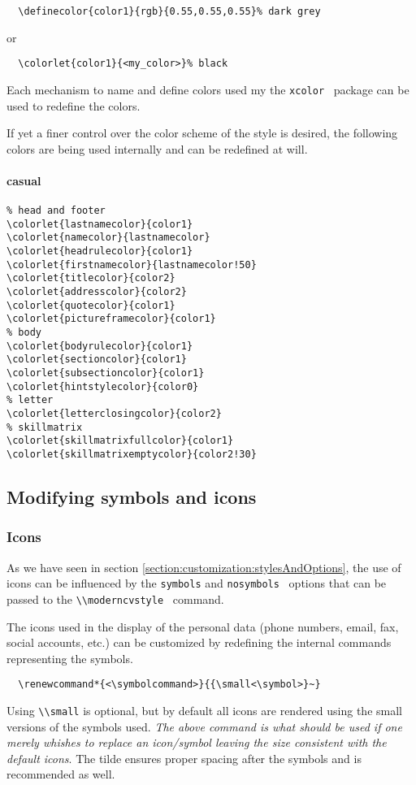 \documentclass[a4paper,11pt]{article}
\newcommand{\code}[1]{\lstinline!#1!}
\newcommand{\Code}[1]{\lstinline!#1!~} %
\begin{document}
\begin{lstlisting}
  \definecolor{color1}{rgb}{0.55,0.55,0.55}% dark grey
\end{lstlisting}
or
\begin{lstlisting}
  \colorlet{color1}{<my_color>}% black
\end{lstlisting}
Each mechanism to name and define colors used my the \Code{xcolor} package can be used to redefine the colors.

If yet a finer control over the color scheme of the style is desired, the following colors are being used internally and can be redefined at will.  

\paragraph{casual}
\begin{lstlisting}
% head and footer
\colorlet{lastnamecolor}{color1}
\colorlet{namecolor}{lastnamecolor}
\colorlet{headrulecolor}{color1}
\colorlet{firstnamecolor}{lastnamecolor!50}
\colorlet{titlecolor}{color2}
\colorlet{addresscolor}{color2}
\colorlet{quotecolor}{color1}
\colorlet{pictureframecolor}{color1}
% body
\colorlet{bodyrulecolor}{color1}
\colorlet{sectioncolor}{color1}
\colorlet{subsectioncolor}{color1}
\colorlet{hintstylecolor}{color0}
% letter
\colorlet{letterclosingcolor}{color2}
% skillmatrix
\colorlet{skillmatrixfullcolor}{color1}
\colorlet{skillmatrixemptycolor}{color2!30}

\end{lstlisting}



\subsection{Modifying symbols and icons}
\subsubsection{Icons}
As we have seen in section \ref{section:customization:stylesAndOptions}, the use of icons can be 
influenced by the \code{symbols} and \Code{nosymbols} options that can be passed to the \Code{\\moderncvstyle} command. \medskip

The icons used in the display of the personal data (phone numbers, email, fax, social accounts, etc.) can be customized by redefining the internal commands representing the symbols.
\begin{lstlisting}
  \renewcommand*{<\symbolcommand>}{{\small<\symbol>}~}
\end{lstlisting} 
Using \code{\\small} is optional, but by default all icons are rendered using the small 
versions of the symbols used. \emph{The above command is what should be used if one merely whishes to 
  replace an icon/symbol leaving the size consistent with the default icons}.
The tilde ensures proper spacing after the symbols and is recommended as well.
\end{document}
